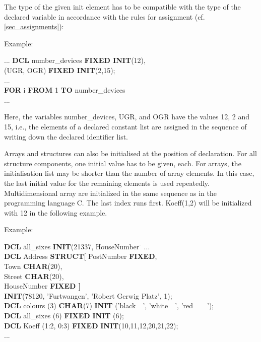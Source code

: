 The type of the given init element has to be compatible with the type of
the declared variable in accordance with the rules for assignment (cf.
\ref{sec_assignments}):

Example:

...
{\bf DCL} number\_devices {\bf FIXED INIT}(12),\\
\x (UGR, OGR) {\bf FIXED INIT}(2,15);\\
...\\
{\bf FOR} i {\bf FROM} 1 {\bf TO} number\_devices\\
...

Here, the variables number\_devices, UGR, and OGR have the values 12, 2
and 15, i.e., the elements of a declared constant list are assigned in
the sequence of writing down the declared identifier list.

Arrays and structures can also be initialised at the position of
declaration. For all structure components, one initial value has to be
given, each. For arrays, the initialisation list may be shorter than the
number of array elements. In this case, the last initial value for the
remaining elements is used repeatedly.
Multidimensional array are initialized in the same sequence as in the 
programming language C. The last index runs first.
Koeff(1,2) will be initialized with 12 in the following example.

Example:

\begin{tabbing}
{\bf DCL} \= all\_sixes \= {\bf INIT}(21337, \= HouseNumber \= \kill
... \> \> \> \> \\
{\bf DCL} \> Address \> {\bf STRUCT}[ \> PostNumber  \> {\bf FIXED},\\
          \>         \>               \> Town        \> {\bf CHAR}(20),\\
          \>         \>               \> Street      \> {\bf CHAR}(20),\\
          \>         \>               \> HouseNumber \> {\bf FIXED \hspace{1cm} ]}\\
          \>         \> {\bf INIT}(78120, 'Furtwangen', 'Robert Gerwig Platz', 1); \> \> \\
{\bf DCL} \> colours \> (3)           \> {\bf CHAR}(7) \> {\bf INIT} ('black\ \ ', 'white\ \ ', 'red\ \ \ \ ');\\
{\bf DCL} \> all\_sixes \> (6)        \> {\bf FIXED}  \> {\bf INIT} (6);\\
{\bf DCL} \> Koeff \> (1:2, 0:3) \> {\bf FIXED}	\> {\bf INIT}(10,11,12,20,21,22);\\
... \> \> \> \>
\end{tabbing}

